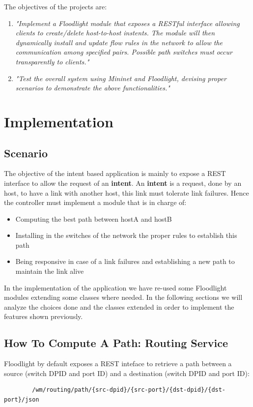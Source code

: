 \documentclass[a4paper]{report}
\begin{document}
	
	\noindent The objectives of the projects are:
	\begin{enumerate}
		\item \textit{"Implement a Floodlight module that exposes a RESTful interface allowing clients to create/delete host-to-host instents. The module will then dynamically install and update flow rules in the network to allow the communication among specified pairs. Possible path switches must occur transparently to clients."}
		
		\item \textit{"Test the overall system using Mininet and Floodlight, devising proper scenarios to demonstrate the above functionalities."}
	\end{enumerate}
	
	
	\chapter{Implementation}
	\section{Scenario}
	\noindent The objective of the intent based application is mainly to expose a REST interface to allow the request of an \textbf{intent}. An \textbf{intent} is a request, done by an host, to have a link with another host, this link must tolerate link failures.
	\noindent Hence the controller must implement a module that is in charge of:
	\begin{itemize}
		\item Computing the best path between hostA and hostB
		\item Installing in the switches of the network the proper rules to establish this path
		\item Being responsive in case of a link failures and establishing a new path to maintain the link alive
	\end{itemize}
	\noindent In the implementation of the application we have re-used some Floodlight modules extending some classes where needed. In the following sections we will analyze the choices done and the classes extended in order to implement the features shown previously.
	
	\section{How To Compute A Path: Routing Service}
	\noindent Floodlight by default exposes a REST inteface to retrieve a path between a source (switch DPID and port ID) and a destination (switch DPID and port ID):
	\begin{verbatim}
		/wm/routing/path/{src-dpid}/{src-port}/{dst-dpid}/{dst-port}/json
	\end{verbatim}
	
\end{document}
